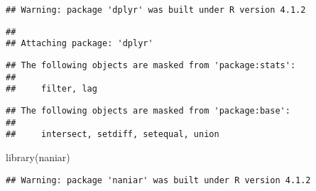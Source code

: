 \documentclass[
]{article}
\newenvironment{Shaded}{\begin{snugshade}}{\end{snugshade}}
\newcommand{\FunctionTok}[1]{\textcolor[rgb]{0.00,0.00,0.00}{#1}}
\newcommand{\NormalTok}[1]{#1}
\begin{document}
\begin{verbatim}
## Warning: package 'dplyr' was built under R version 4.1.2
\end{verbatim}

\begin{verbatim}
## 
## Attaching package: 'dplyr'
\end{verbatim}

\begin{verbatim}
## The following objects are masked from 'package:stats':
## 
##     filter, lag
\end{verbatim}

\begin{verbatim}
## The following objects are masked from 'package:base':
## 
##     intersect, setdiff, setequal, union
\end{verbatim}

\begin{Shaded}
\begin{Highlighting}[]
\FunctionTok{library}\NormalTok{(naniar)}
\end{Highlighting}
\end{Shaded}

\begin{verbatim}
## Warning: package 'naniar' was built under R version 4.1.2
\end{verbatim}
\end{document}
